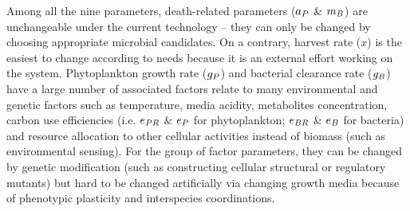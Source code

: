 \documentclass[../thesis.tex]{subfiles} %
\begin{document}
Among all the nine parameters, death-related parameters ($a_P$ \& $m_B$) are unchangeable under the current technology -- they can only be changed by choosing appropriate microbial candidates.  On a contrary, harvest rate ($x$) is the easiest to change according to needs because it is an external effort working on the system.  Phytoplankton growth rate ($g_P$) and bacterial clearance rate ($g_B$) have a large number of associated factors relate to many environmental and genetic factors such as temperature, media acidity, metabolites concentration, carbon use efficiencies (i.e. $e_{PR}$ \& $e_P$ for phytoplankton; $e_{BR}$ \& $e_B$ for bacteria) and resource allocation to other cellular activities instead of biomass (such as environmental sensing).  For the group of factor parameters, they can be changed by genetic modification (such as constructing cellular structural or regulatory mutants) but hard to be changed artificially via changing growth media because of phenotypic plasticity and interspecies coordinations.
\end{document}
